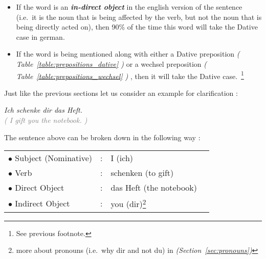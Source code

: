 \documentclass[a4paper,twocolumn,10pt]{article}
\newcommand{\bulletpoint}
{ $\bullet$  }
\newcommand{\newpar}
{\par \vspace{0.3cm}}
\begin{document}
\nolinenumbers
\begin{itemize}[noitemsep]

	\item If the word is an \textbf{\textit{in-direct object}} in the english
		version of the sentence (i.e.\ it is the noun that is being affected by
		the verb, but not the noun that is being directly acted on), then 90\%
		of the time this word will take the Dative case in german.

   \item If the word is being mentioned along with either a Dative preposition
	   \textit{( Table~\ref{table:prepositions_dative} )} or a wechsel
	   preposition \textit{( Table~\ref{table:prepositions_wechsel} )} , then it
	   will take the Dative case.~\footnote{See previous footnote.} 

\end{itemize}
\linenumbers

Just like the previous sections let us consider an example for clarification
:\newpar

\noindent
\textit{Ich schenke dir das Heft.}\\
\textcolor{gray} { \textit{( I gift you the notebook. )} } \newpar

The sentence above can be broken down in the following way :


\nolinenumbers

\vspace{0.2cm}

\begin{tabularx}{0.95\linewidth}{lllX}

\rowcolor{white} \bulletpoint Subject (Nominative) & : & I (ich)   & \\
\rowcolor{white} \bulletpoint Verb                 & : & schenken (to gift) & \\
\rowcolor{white} \bulletpoint Direct Object        & : & das Heft (the notebook)  & \\
\rowcolor{white} \bulletpoint Indirect Object      & : & you (dir)\footnote{more
about pronouns (i.e.\ why dir and not du) in \textit{(Section~\ref{sec:pronouns})}  } & \\

\end{tabularx}

\vspace{0.2cm}

\linenumbers
\end{document}
